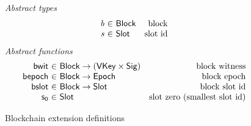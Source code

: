 \begin{figure}[htb]
  \emph{Abstract types}
  \begin{equation*}
    \begin{array}{r@{~\in~}lr}
      \var{b} & \Block & \text{block}\\
      \var{s} & \Slot & \text{slot id}\\
    \end{array}
  \end{equation*}
  \emph{Abstract functions}
  \begin{equation*}
    \begin{array}{r@{~\in~}lr}
    \fun{bwit} & \Block \to (\VKey \times \Sig) & \text{block witness}\\
      \fun{bepoch} & \Block \to \Epoch & \text{block epoch}\\
      \fun{bslot} & \Block \to \Slot & \text{block slot id}\\
    \fun{s_0} & \Slot  & \text{slot zero (smallest slot id)}\\
    \end{array}
  \end{equation*}
  \caption{Blockchain extension definitions}
  \label{fig:defs:chain-extension}
\end{figure}

